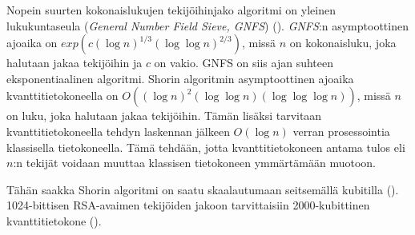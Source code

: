 Nopein suurten kokonaislukujen tekijöihinjako algoritmi on yleinen lukukuntaseula (\emph{General Number Field Sieve, GNFS}) (\cite{doi:10.1137/S0036144598347011}). \emph{GNFS}:n asymptoottinen ajoaika on $exp(c(\log n)^{1/3} (\log \log n)^{2/3})$, missä $n$ on kokonaisluku, joka halutaan jakaa tekijöihin ja $c$ on vakio. GNFS on siis ajan suhteen eksponentiaalinen algoritmi. Shorin algoritmin asymptoottinen ajoaika kvanttitietokoneella on $O((\log n)^{2}(\log \log n) (\log \log \log n))$, missä $n$ on luku, joka halutaan jakaa tekijöihin. Tämän lisäksi tarvitaan kvanttitietokoneella tehdyn laskennan jälkeen $O(\log n)$ verran prosessointia klassisella tietokoneella. Tämä tehdään, jotta kvanttitietokoneen antama tulos eli $n$:n tekijät voidaan muuttaa klassisen tietokoneen ymmärtämään muotoon.

Tähän saakka Shorin algoritmi on saatu skaalautumaan seitsemällä kubitilla (\cite{doi:10.1126/science.aad9480}). 1024-bittisen RSA-avaimen tekijöiden jakoon tarvittaisiin 2000-kubittinen kvanttitietokone (\cite{mavroeidis2018impact}).